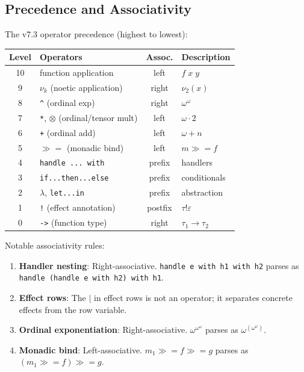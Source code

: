 \subsection{Precedence and Associativity}
\label{subsec:precedence}

\begin{definition}
\label{def:precedence-table}
The v7.3 operator precedence (highest to lowest):
\begin{center}
\begin{tabular}{clcl}
\toprule
\textbf{Level} & \textbf{Operators} & \textbf{Assoc.} & \textbf{Description} \\
\midrule
10 & function application & left & $f\; x\; y$ \\
9 & $\nu_k$ (noetic application) & right & $\nu_2(x)$ \\
8 & \texttt{\^{}} (ordinal exp) & right & $\omega^{\omega}$ \\
7 & \texttt{*}, $\otimes$ (ordinal/tensor mult) & left & $\omega \cdot 2$ \\
6 & \texttt{+} (ordinal add) & left & $\omega + n$ \\
5 & $\gg\!=$ (monadic bind) & left & $m \gg\!= f$ \\
4 & \texttt{handle ... with} & prefix & handlers \\
3 & \texttt{if...then...else} & prefix & conditionals \\
2 & $\lambda$, \texttt{let...in} & prefix & abstraction \\
1 & \texttt{!} (effect annotation) & postfix & $\tau \mathbin{!} \varepsilon$ \\
0 & \texttt{->} (function type) & right & $\tau_1 \to \tau_2$ \\
\bottomrule
\end{tabular}
\end{center}
\end{definition}

\begin{definition}
\label{def:associativity}
Notable associativity rules:
\begin{enumerate}
  \item \textbf{Handler nesting}: Right-associative. \texttt{handle e with h1 with h2} parses as \texttt{handle (handle e with h2) with h1}.

  \item \textbf{Effect rows}: The $|$ in effect rows is not an operator; it separates concrete effects from the row variable.

  \item \textbf{Ordinal exponentiation}: Right-associative. $\omega^{\omega^\omega}$ parses as $\omega^{(\omega^\omega)}$.

  \item \textbf{Monadic bind}: Left-associative. $m_1 \gg\!= f \gg\!= g$ parses as $(m_1 \gg\!= f) \gg\!= g$.
\end{enumerate}
\end{definition}

